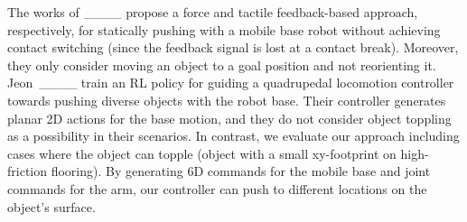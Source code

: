 The works of ____ propose a force and tactile feedback-based approach, respectively, for statically pushing with a mobile base robot without achieving contact switching (since the feedback signal is lost at a contact break). Moreover, they only consider moving an object to a goal position and not reorienting it. Jeon~\etal____ train an RL policy for guiding a quadrupedal locomotion controller towards pushing diverse objects with the robot base. Their controller generates planar 2D actions for the base motion, and they do not consider object toppling as a possibility in their scenarios. In contrast, we evaluate our approach including cases where the object can topple (\ie object with a small xy-footprint on high-friction flooring). By generating 6D commands for the mobile base and joint commands for the arm, our controller can push to different locations on the object's surface.